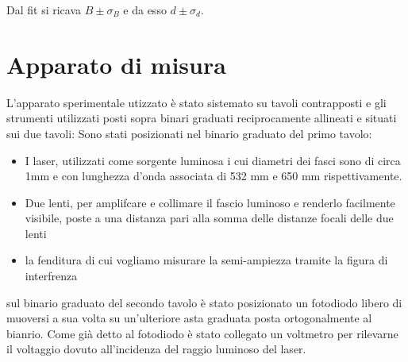 \documentclass[10pt,twocolumn]{article}
\begin{document}
Dal fit si ricava $B \pm \sigma_B$ e da esso $d \pm \sigma_d$.
\section{Apparato di misura}
 L'apparato sperimentale utizzato è stato sistemato su tavoli contrapposti  e gli strumenti utilizzati posti sopra binari graduati reciprocamente allineati e situati sui due tavoli: Sono stati posizionati nel binario graduato del primo tavolo:
 \begin{itemize}
  \item I laser, utilizzati come sorgente luminosa i cui diametri dei fasci sono di circa 1mm e con lunghezza d'onda associata di 532 mm e 650 mm rispettivamente.
  \item Due lenti, per amplifcare e collimare il fascio luminoso e renderlo facilmente visibile,  poste a una distanza pari alla somma delle distanze focali delle due lenti
  \item la fenditura di cui vogliamo misurare la semi-ampiezza tramite la figura di interfrenza
 \end{itemize} 
 sul binario graduato del secondo tavolo è stato posizionato un fotodiodo  libero di muoversi a sua volta su un'ulteriore asta graduata posta ortogonalmente al bianrio.  Come già detto  al fotodiodo è stato collegato un voltmetro per rilevarne il voltaggio dovuto all'incidenza del raggio luminoso del laser.
 
\end{document}

